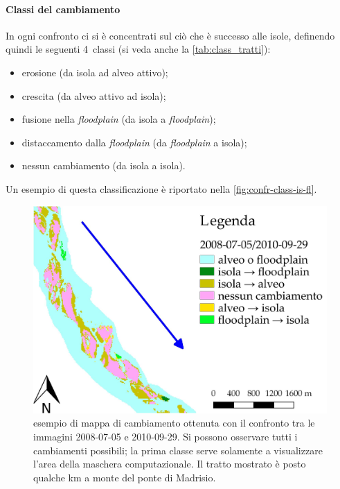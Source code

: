 \paragraph{Classi del cambiamento}
In ogni confronto ci si è concentrati sul ciò che è successo alle isole, definendo quindi le seguenti 4~classi (si veda anche la \vref{tab:class_tratti}):
%
\begin{itemize}
	\item erosione (da isola ad alveo attivo);
	\item crescita (da alveo attivo ad isola);
	\item fusione nella \emph{floodplain} (da isola a \emph{floodplain});
	\item distaccamento dalla \emph{floodplain} (da \emph{floodplain} a isola);
	\item nessun cambiamento (da isola a isola).
\end{itemize}
%
Un esempio di questa classificazione è riportato nella \vref{fig:confr-class-is-fl}.
%
\begin{figure}
	\centering
	\includegraphics[width=.8\textwidth]{files/confr_class_is_fl.jpeg}
	\caption[esempio di mappa di cambiamento]{esempio di mappa di cambiamento ottenuta con il confronto tra le immagini \AST{} 2008-07-05 e 2010-09-29. Si possono osservare tutti i cambiamenti possibili; la prima classe serve solamente a visualizzare l'area della maschera computazionale. Il tratto mostrato è posto qualche \si{\kilo\m} a monte del ponte di Madrisio.}
	\label{fig:confr-class-is-fl}
\end{figure}
%


